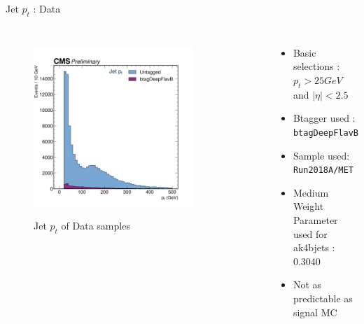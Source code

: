 \documentclass[10pt,xcolor=dvipsnames,aspectratio=169]{beamer}
\begin{document}
    
   \begin{frame}[fragile]{Jet $p_t$ : Data} 
    \begin{columns}
    \begin{figure} 
    \centering 
     \includegraphics[width=0.8\textwidth]{../Archive/KinemPlots/JetsData.png }
    \label{JetData} 
    \caption{Jet $p_t$ of Data samples}
    \end{figure} 
    \begin{itemize} 
    \raggedright 
    \small
    \item Basic selections : $p_t > 25 GeV $ and $|\eta | < 2.5 $
    \item {Btagger used : \texttt{btagDeepFlavB}} 
    \item {Sample used: \texttt{Run2018A/MET}} 
    \item Medium Weight Parameter used for ak4bjets : 0.3040
    \item Not as predictable as signal MC 
    \end{itemize}
    \end{columns} 
    \end{frame} 
    
\end{document}
